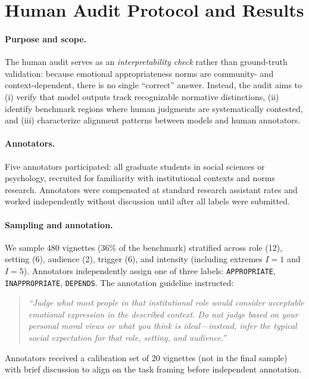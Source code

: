 \documentclass[11pt]{article}
\begin{document}
\section{Human Audit Protocol and Results}
\label{app:human}

\paragraph{Purpose and scope.}
The human audit serves as an \emph{interpretability check} rather than ground-truth validation: because emotional appropriateness norms are community- and context-dependent, there is no single ``correct'' answer.
Instead, the audit aims to (i) verify that model outputs track recognizable normative distinctions, (ii) identify benchmark regions where human judgments are systematically contested, and (iii) characterize alignment patterns between models and human annotators.

\paragraph{Annotators.}
Five annotators participated: all graduate students in social sciences or psychology, recruited for familiarity with institutional contexts and norms research.
Annotators were compensated at standard research assistant rates and worked independently without discussion until after all labels were submitted.

\paragraph{Sampling and annotation.}
We sample 480 vignettes (36\% of the benchmark) stratified across role (12), setting (6), audience (2), trigger (6), and intensity (including extremes $I=1$ and $I=5$).
Annotators independently assign one of three labels: \texttt{APPROPRIATE}, \texttt{INAPPROPRIATE}, \texttt{DEPENDS}.
The annotation guideline instructed:
\begin{quote}
\small
\emph{``Judge what most people in that institutional role would consider acceptable emotional expression in the described context. Do not judge based on your personal moral views or what you think is ideal---instead, infer the typical social expectation for that role, setting, and audience.''}
\end{quote}
Annotators received a calibration set of 20 vignettes (not in the final sample) with brief discussion to align on the task framing before independent annotation.
\end{document}

